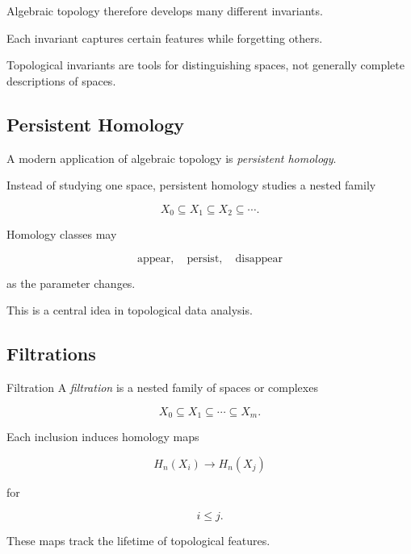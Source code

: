 Algebraic topology therefore develops many different invariants.

Each invariant captures certain features while forgetting others.

\begin{conceptbox}
Topological invariants are tools for distinguishing spaces, not generally
complete descriptions of spaces.
\end{conceptbox}

\subsection{Persistent Homology}
\label{subsec:persistent-homology-intro}

A modern application of algebraic topology is \emph{persistent homology}.

Instead of studying one space, persistent homology studies a nested family

\[
\boxed{
X_0
\subseteq
X_1
\subseteq
X_2
\subseteq
\cdots.
}
\]

Homology classes may

\[
\boxed{
\text{appear},
\quad
\text{persist},
\quad
\text{disappear}
}
\]

as the parameter changes.

This is a central idea in topological data analysis.

\subsection{Filtrations}
\label{subsec:topological-filtrations}

\begin{definitionbox}{Filtration}
A \emph{filtration} is a nested family of spaces or complexes

\[
\boxed{
X_0
\subseteq
X_1
\subseteq
\cdots
\subseteq
X_m.
}
\]
\end{definitionbox}

Each inclusion induces homology maps

\[
H_n(X_i)
\to
H_n(X_j)
\]

for

\[
i\leq j.
\]

These maps track the lifetime of topological features.

